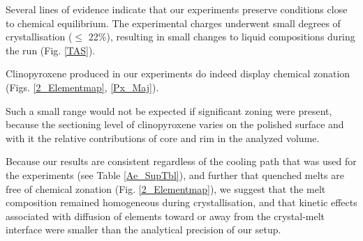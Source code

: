 
Several lines of evidence indicate that our experiments preserve conditions close to chemical equilibrium. 
	The experimental charges underwent small degrees of crystallisation ($\le$ 22\%), resulting in small changes to liquid compositions during the run (Fig. \ref{TAS}). 


Clinopyroxene produced in our experiments do indeed display chemical zonation  
	(Figs. \ref{2_Elementmap}, \ref{Px_Maj}).
	

	Such a small range would not be expected if significant zoning were present, because the sectioning level of clinopyroxene varies on the polished surface and with it the relative contributions of core and rim in the analyzed volume. 
	
	

	Because our results are consistent regardless of the cooling path that was used for the experiments (see Table \ref{Ae_SupTbl}), and further that quenched melts are free of chemical zonation (Fig. \ref{2_Elementmap}), we suggest that the melt composition remained homogeneous during crystallisation, and that kinetic effects associated with diffusion of elements toward or away from the crystal-melt interface \citep[e.g.][]{Lofgren2006} were smaller than the analytical precision of our setup.
	
	
